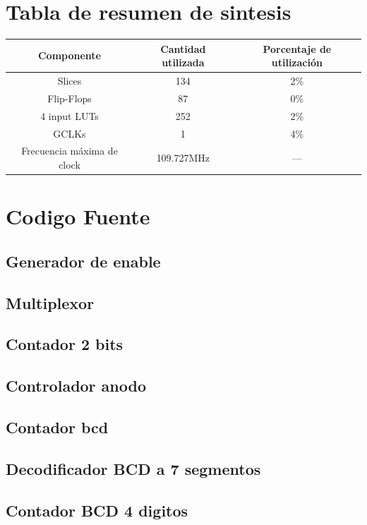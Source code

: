 \documentclass[10pt,a4paper]{article}
\begin{document}
\section*{Tabla de resumen de sintesis}
\begin{table}[h!]
\begin{tabular}{|c|c|c|}
\hline 
Componente & Cantidad utilizada & Porcentaje de utilización \\ 
\hline 
Slices & 134 & 2\% \\ 
\hline 
Flip-Flops & 87 & 0\% \\ 
\hline 
4 input LUTs & 252 & 2\% \\ 
\hline 
GCLKs & 1 & 4\% \\ 
\hline 
Frecuencia máxima de clock & 109.727MHz & --- \\ 
\hline 
\end{tabular} 
\end{table}

\section*{Codigo Fuente}

\subsection*{Generador de enable}


\newpage
\subsection*{Multiplexor}


\newpage
\subsection*{Contador 2 bits}


\newpage
\subsection*{Controlador anodo}


\newpage
\subsection*{Contador bcd}


\newpage

\subsection*{Decodificador BCD a 7 segmentos}


\newpage
\subsection*{Contador BCD 4 digitos}

\end{document}
